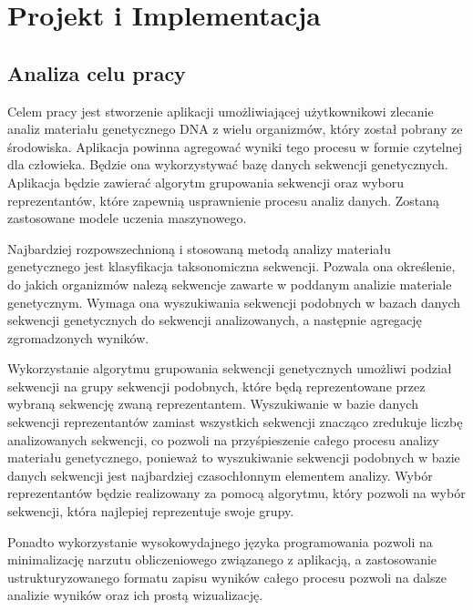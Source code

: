 \cleardoublepage
\section{Projekt i Implementacja}

    \subsection{Analiza celu pracy}
        
        Celem pracy jest stworzenie aplikacji umożliwiającej użytkownikowi zlecanie analiz materiału genetycznego DNA z wielu organizmów, który został pobrany ze środowiska. Aplikacja powinna agregować wyniki tego procesu w formie czytelnej dla człowieka. Będzie ona wykorzystywać bazę danych sekwencji genetycznych. Aplikacja będzie zawierać algorytm grupowania sekwencji oraz wyboru reprezentantów, które zapewnią usprawnienie procesu analiz danych. Zostaną zastosowane modele uczenia maszynowego.

        Najbardziej rozpowszechnioną i stosowaną metodą analizy materiału genetycznego jest klasyfikacja taksonomiczna sekwencji. Pozwala ona określenie, do jakich organizmów nalezą sekwencje zawarte w poddanym analizie materiale genetycznym. Wymaga ona wyszukiwania sekwencji podobnych w bazach danych sekwencji genetycznych do sekwencji analizowanych, a następnie agregację zgromadzonych wyników.

        Wykorzystanie algorytmu grupowania sekwencji genetycznych umożliwi podział sekwencji na grupy sekwencji podobnych, które będą reprezentowane przez wybraną sekwencję zwaną reprezentantem. Wyszukiwanie w bazie danych sekwencji reprezentantów zamiast wszystkich sekwencji znacząco zredukuje liczbę analizowanych sekwencji, co pozwoli na przyśpieszenie całego procesu analizy materiału genetycznego, ponieważ to wyszukiwanie sekwencji podobnych w bazie danych sekwencji jest najbardziej czasochłonnym elementem analizy. Wybór reprezentantów będzie realizowany za pomocą algorytmu, który pozwoli na wybór sekwencji, która najlepiej reprezentuje swoje grupy.

        Ponadto wykorzystanie wysokowydajnego języka programowania pozwoli na minimalizację narzutu obliczeniowego związanego z aplikacją, a zastosowanie ustrukturyzowanego formatu zapisu wyników całego procesu pozwoli na dalsze analizie wyników oraz ich prostą wizualizację.

